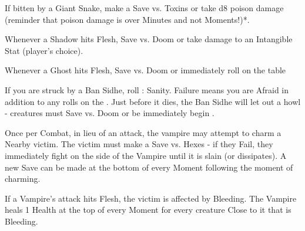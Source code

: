 {\MONSTERBLOCK[
  Name=Giant Snake,
  Link=monster-giant-snake,
  MV=Fast,
  WK=d16,
  DMG=d10 1 Nearby,
  HD=4,
  Power=Average,
  Soak=2,
  Morale=Orderly,
  Save=3,
  Extras={}
]
If bitten by a Giant Snake, make a Save vs. Toxins or take d8 poison damage (reminder that poison damage is over Minutes and not Moments!)*.

\newpage



\MONSTERBLOCK[
  Name=Shadow,
  Link=monster-shadow,
  MV=Base,
  WK=d16,
  DMG=d4 Close,
  HD=4,
  Power=Average,
  Soak=0,
  Morale=Orderly,
  Save=3,
  Extras={}
]

Whenever a Shadow hits Flesh, Save vs. Doom or take \DCDOWN damage to an Intangible Stat (player's choice).

\MONSTERBLOCK[
  Name=Ghost,
  Link=monster-ghost,
  MV=Base,
  WK=d16,
  DMG=d10 2 Nearby,
  HD=5,
  Power=Average,
  Soak=0,
  Morale=Orderly,
  Save=3,
  Extras={}
]
Whenever a Ghost hits Flesh, Save vs. Doom or  immediately roll on the  table


\MONSTERBLOCK[
  Name=Ban Sidhe,
  Link=monster-ban-sidhe,
  MV=Base,
  WK=d12,
  DMG=d12 1 Close,
  HD=6,
  Power=Average,
  Soak=0,
  Morale=Orderly,
  Save=4,
  Extras={}
]
If you are struck by a Ban Sidhe, roll \RS : Sanity. Failure means you are Afraid in addition to any rolls on the .  Just before it dies, the Ban Sidhe will let out a howl - creatures must Save vs. Doom or be immediately begin .

\MONSTERBLOCK[
  Name=Vampire,
  Link=monster-vampire,
  MV=Base,
  WK=d10,
  DMG=2d8 All Close,
  HD=7,
  Power=Average,
  Soak=0,
  Morale=Orderly,
  Save=4,
  Extras={Bloodthirsty}
]

Once per Combat, in lieu of an attack, the vampire may attempt to charm a Nearby victim.  The victim must make a Save vs. Hexes - if they Fail, they immediately fight on the side of the Vampire until it is slain (or dissipates).  A new Save can be made at the bottom of every Moment following the moment of charming.

If a Vampire's attack hits Flesh, the victim is affected by Bleeding.  The Vampire heals 1 Health at the top of every Moment for every creature Close to it that is Bleeding.

}
